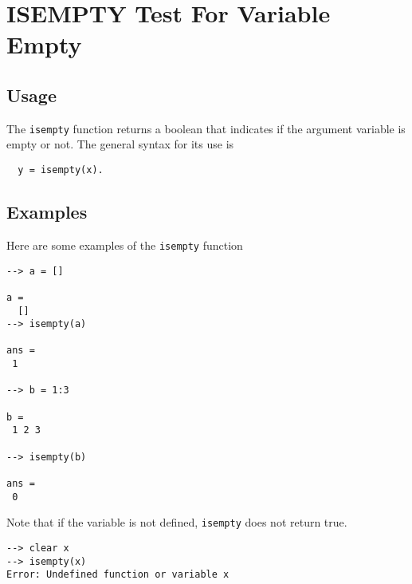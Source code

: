\section{ISEMPTY Test For Variable Empty}

\subsection{Usage}

The \verb|isempty| function returns a boolean that indicates
if the argument variable is empty or not.  The general
syntax for its use is
\begin{verbatim}
  y = isempty(x).
\end{verbatim}
\subsection{Examples}

Here are some examples of the \verb|isempty| function
\begin{verbatim}
--> a = []

a = 
  []
--> isempty(a)

ans = 
 1 

--> b = 1:3

b = 
 1 2 3 

--> isempty(b)

ans = 
 0 
\end{verbatim}
Note that if the variable is not defined, \verb|isempty| 
does not return true.
\begin{verbatim}
--> clear x
--> isempty(x)
Error: Undefined function or variable x
\end{verbatim}
